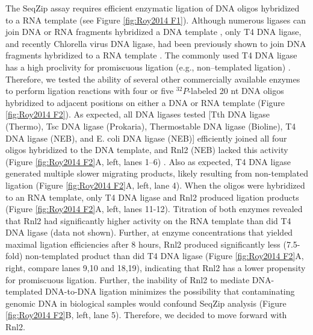 {		The SeqZip assay requires efficient enzymatic ligation of DNA oligos hybridized to a RNA template (see Figure \ref{fig:Roy2014 F1}). Although numerous ligases can join DNA or RNA fragments hybridized a DNA template \citep{Bullard2006}, only T4 DNA ligase, and recently Chlorella virus DNA ligase, had been previously shown to join DNA fragments hybridized to a RNA template \citep{Nilsson2001,Lohman2013c}. The commonly used T4 DNA ligase has a high proclivity for promiscuous ligation (e.g., non–templated ligation) \citep{Kuhn2005}. Therefore, we tested the ability of several other commercially available enzymes to perform ligation reactions with four or five $^{32}P$-labeled 20 nt DNA oligos hybridized to adjacent positions on either a DNA or RNA template (Figure \ref{fig:Roy2014 F2}). As expected, all DNA ligases tested [Tth DNA ligase (Thermo), Tsc DNA ligase (Prokaria), Thermostable DNA ligase (Bioline), T4 DNA ligase (NEB), and E. coli DNA ligase (NEB)] efficiently joined all four oligos hybridized to the DNA template, and Rnl2 (NEB) lacked this activity (Figure \ref{fig:Roy2014 F2}A, left, lanes 1–6) \citep{Bullard2006}. Also as expected, T4 DNA ligase generated multiple slower migrating products, likely resulting from non-templated ligation (Figure \ref{fig:Roy2014 F2}A, left, lane 4). When the oligos were hybridized to an RNA template, only T4 DNA ligase and Rnl2 produced ligation products (Figure \ref{fig:Roy2014 F2}A, left, lanes 11-12). Titration of both enzymes revealed that Rnl2 had significantly higher activity on the RNA template than did T4 DNA ligase (data not shown). Further, at enzyme concentrations that yielded maximal ligation efficiencies after 8 hours, Rnl2 produced significantly less (7.5-fold) non-templated product than did T4 DNA ligase (Figure \ref{fig:Roy2014 F2}A, right, compare lanes 9,10 and 18,19), indicating that Rnl2 has a lower propensity for promiscuous ligation. Further, the inability of Rnl2 to mediate DNA-templated DNA-to-DNA ligation minimizes the possibility that contaminating genomic DNA in biological samples would confound SeqZip analysis (Figure \ref{fig:Roy2014 F2}B, left, lane 5). Therefore, we decided to move forward with Rnl2.

}
